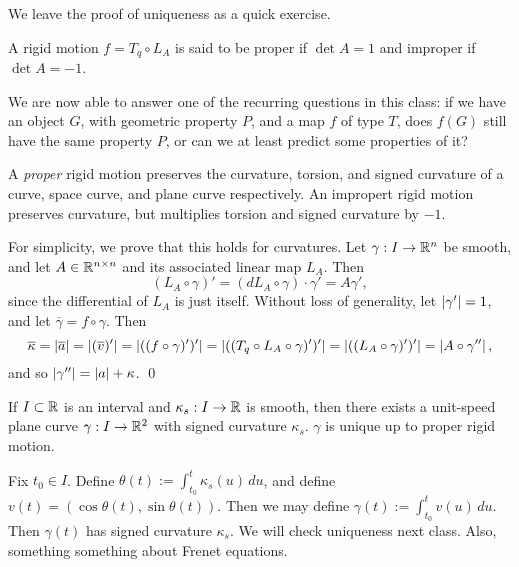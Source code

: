 \medskip\newline
We leave the proof of uniqueness as a quick exercise.
\begin{definition}
    A rigid motion $f = T_q \circ L_A$ is said to be proper if $\det A = 1$ and improper if $\det A = -1$.
\end{definition}
\noindent We are now able to answer one of the recurring questions in this class: if we have an object $G$, with geometric property $P$, and a map $f$ of type $T$, does $f(G)$ still have the same property $P$, or can we at least predict some properties of it?
\begin{simplethm}
    A \textit{proper} rigid motion preserves the curvature, torsion, and signed curvature of a curve, space curve, and plane curve respectively. An impropert rigid motion preserves curvature, but multiplies torsion and signed curvature by $-1$.
\end{simplethm}
\noindent For simplicity, we prove that this holds for curvatures. Let $\gamma : I \to \mathbb R^n$ be smooth, and let $A \in \mathbb R^{n \times n}$ and its associated linear map $L_A$. Then
\[ (L_A \circ \gamma)' = (dL_A \circ \gamma) \cdot \gamma' = A \gamma', \]
since the differential of $L_A$ is just itself. Without loss of generality, let $\left\lvert \gamma' \right\rvert = 1$, and let $\overline{\gamma} = f \circ \gamma$. Then
\[ \overline{\kappa} = \left\lvert \overline{a} \right\rvert = \left\lvert (\overline{v})' \right\rvert = \left\lvert ((f \circ \gamma)')' \right\rvert = \left\lvert ((T_q \circ L_A \circ \gamma)')' \right\rvert = \left\lvert ((L_A \circ \gamma)')' \right\rvert = \left\lvert A \circ \gamma'' \right\rvert, \]
and so $\left\lvert \gamma'' \right\rvert = \left\lvert a \right\rvert + \kappa$. \qed
\begin{simplethm}
    If $I \subset \mathbb R$ is an interval and $\kappa_s : I \to \mathbb R$ is smooth, then there exists a unit-speed plane curve $\gamma : I \to \mathbb R^2$ with signed curvature $\kappa_s$. $\gamma$ is unique up to proper rigid motion.
\end{simplethm}
\noindent Fix $t_0 \in I$. Define $\theta(t) := \int_{t_0}^t \kappa_s(u) \, du$, and define $v(t) = (\cos \theta(t), \sin \theta(t))$. Then we may define $\gamma(t) := \int_{t_0}^t v(u) \, du$. Then $\gamma(t)$ has signed curvature $\kappa_s$. We will check uniqueness next class. Also, something something about Frenet equations.